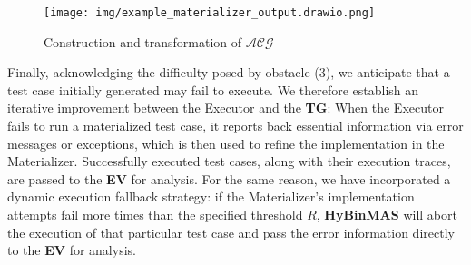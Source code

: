 \documentclass[acmsmall,screen,review,anonymous]{acmart} %
\begin{document}
\begin{figure}[h] %
    \centering
    \texttt{[image: img/example\_materializer\_output.drawio.png]} %
    \caption{Construction and transformation of $\mathcal{ACG}$} %
    \label{fig:example_materializer_output} %
\end{figure}

Finally, acknowledging the difficulty posed by obstacle (3), we anticipate that a test case initially generated may fail to execute. We therefore establish an iterative improvement between the Executor and the \textbf{TG}: When the Executor fails to run a materialized test case, it reports back essential information via error messages or exceptions, which is then used to refine the implementation in the Materializer. Successfully executed test cases, along with their execution traces, are passed to the \textbf{EV} for analysis. For the same reason, we have incorporated a dynamic execution fallback strategy: if the Materializer's implementation attempts fail more times than the specified threshold $R$, \textbf{HyBinMAS} will abort the execution of that particular test case and pass the error information directly to the \textbf{EV} for analysis.


\end{document}
